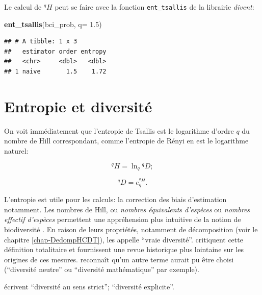 \documentclass[
  11pt,
  american,
  a4paper,
  extrafontsizes,onecolumn,openright
  ]{memoir}
\newenvironment{Shaded}{\begin{snugshade}}{\end{snugshade}}
\newcommand{\AttributeTok}[1]{\textcolor[rgb]{0.13,0.29,0.53}{#1}}
\newcommand{\FloatTok}[1]{\textcolor[rgb]{0.00,0.00,0.81}{#1}}
\newcommand{\FunctionTok}[1]{\textcolor[rgb]{0.13,0.29,0.53}{\textbf{#1}}}
\newcommand{\NormalTok}[1]{#1}
\begin{document}
Le calcul de \(^{q}\!H\) peut se faire avec la fonction \texttt{ent\_tsallis} de la librairie \emph{divent}:

\scriptsize

\begin{Shaded}
\begin{Highlighting}[]
\FunctionTok{ent\_tsallis}\NormalTok{(bci\_prob, }\AttributeTok{q=} \FloatTok{1.5}\NormalTok{)}
\end{Highlighting}
\end{Shaded}

\begin{verbatim}
## # A tibble: 1 x 3
##   estimator order entropy
##   <chr>     <dbl>   <dbl>
## 1 naive       1.5    1.72
\end{verbatim}

\normalsize

\section{Entropie et diversité}\label{entropie-et-diversituxe9}

On voit immédiatement que l'entropie de Tsallis est le logarithme d'ordre \(q\) du nombre de Hill correspondant, comme l'entropie de Rényi en est le logarithme naturel:

\begin{equation}
  \label{eq:HlnD}
  ^{q}\!H = \ln_q{^{q}\!D};
\end{equation}

\begin{equation}
  \label{eq:DexpH}
  ^{q}\!D = e_q^{^{q}\!H}.
\end{equation}

L'entropie est utile pour les calculs: la correction des biais d'estimation notamment.
Les nombres de Hill, ou \emph{nombres équivalents d'espèces} ou \emph{nombres effectif d'espèces} permettent une appréhension plus intuitive de la notion de biodiversité \autocite{Jost2006}.
En raison de leurs propriétés, notamment de décomposition (voir le chapitre \ref{chap-DedompHCDT}), \textcite{Jost2007} les appelle \enquote{vraie diversité}.
\textcite{Hoffmann2008} critiquent cette définition totalitaire et fournissent une revue historique plus lointaine sur les origines de ces mesures.
\textcite{Jost2009} reconnaît qu'un autre terme aurait pu être choisi (\enquote{diversité neutre} ou \enquote{diversité mathématique} par exemple).

\textcite{Dauby2012} écrivent \enquote{diversité au sens strict}; \textcite{Gregorius2010} \enquote{diversité explicite}.
\end{document}
